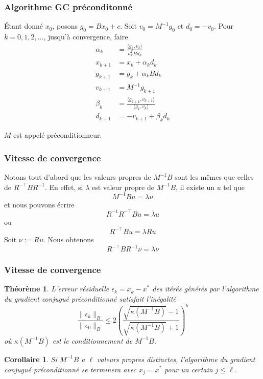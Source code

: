 \documentclass[usepdftitle=false,aspectratio=169]{beamer}
\newtheorem{thm}{Théorème}
\newtheorem{coro}{Corollaire}
\begin{document}
\begin{frame}
\frametitle{Algorithme GC préconditonné}


Étant donné $x_0$, posons $g_0 = B x_0 + c$.
Soit $v_0 = M^{-1} g_0$ et $d_0 = -v_0$.
Pour $k = 0,1,2,\ldots$, jusqu'à convergence, faire
\begin{align*}
\alpha_k &= \frac{\langle g_k, v_k \rangle}{d_k^T B d_k} \\
x_{k+1} &= x_k + \alpha_k d_k \\
g_{k+1} &= g_k + \alpha_k B d_k \\
v_{k+1} &= M^{-1}g_{k+1} \\
\beta_k &= \frac{\langle g_{k+1}, v_{k+1} \rangle}{\langle g_k, v_k \rangle} \\
d_{k+1} &= -v_{k+1} + \beta_k d_k
\end{align*}

\mbox{}

$M$ est appelé préconditionneur.

\end{frame}

\begin{frame}
\frametitle{Vitesse de convergence}

Notons tout d'abord que les valeurs propres de $M^{-1}B$ sont les mêmes que celles de $R^{-\top}BR^{-1}$.
En effet, si $\lambda$ est valeur propre de $M^{-1}B$, il existe un $u$ tel que
$$
M^{-1}B u = \lambda u
$$
et nous pouvons écrire
$$
R^{-1}R^{-\top}B u = \lambda u
$$
ou
$$
R^{-\top}B u = \lambda Ru
$$
Soit $\nu := Ru$. Nous obtenons
$$
R^{-\top}B R^{-1}\nu = \lambda \nu
$$
\end{frame}

\begin{frame}
\frametitle{Vitesse de convergence}
	
\begin{thm}
L'erreur résiduelle $\epsilon_k = x_k - x^*$ des itérés générés par l'algorithme du gradient conjugué préconditionné satisfait l'inégalité
		$$
		\frac{\| \epsilon_k \|_B}{\| \epsilon_0 \|_B}
		\leq 2\left( \frac{\sqrt{\kappa(M^{-1}B)}-1}{\sqrt{\kappa(M^{-1}B)}+1} \right)^k
		$$
		où $\kappa(M^{-1}B)$ est le conditionnement de $M^{-1}B$.
\end{thm}

\begin{coro}
Si $M^{-1}B$ a $\ell$ valeurs propres distinctes, l'algorithme du gradient conjugué préconditionné se terminera avec $x_j = x^*$ pour un certain $j \leq \ell$.
\end{coro}
	
\end{frame}
\end{document}
